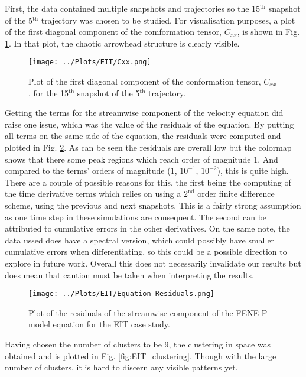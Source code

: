 \documentclass[12pt]{report} %
\begin{document}
First, the data contained multiple snapshots and trajectories so the 15$^{\text{th}}$ snapshot of the 5$^{\text{th}}$ trajectory was chosen to be studied. For visualisation purposes, a plot of the first diagonal component of the comformation tensor, $C_{xx}$, is shown in Fig. \ref{fig:EIT_Cxx}. In that plot, the chaotic arrowhead structure is clearly visible.

\begin{figure}[htbp]
  \centering
  \texttt{[image: ../Plots/EIT/Cxx.png]}
  \caption{Plot of the first diagonal component of the conformation tensor, $C_{xx}$, for the 15$^{\text{th}}$ snapshot of the 5$^{\text{th}}$ trajectory.}
  \label{fig:EIT_Cxx}
\end{figure}

Getting the terms for the streamwise component of the velocity equation did raise one issue, which was the value of the residuals of the equation. By putting all terms on the same side of the equation, the residuals were computed and plotted in Fig. \ref{fig:EIT_residuals}. As can be seen the residuals are overall low but the colormap shows that there some peak regions which reach order of magnitude 1. And compared to the terms' orders of magnitude ($1$, $10^{-1}$, $10^{-2}$), this is quite high. There are a couple of possible reasons for this, the first being the computing of the time derivative terms which relies on using a $2^{\text{nd}}$ order finite difference scheme, using the previous and next snapshots. This is a fairly strong assumption as one time step in these simulations are consequent. The second can be attributed to cumulative errors in the other derivatives. On the same note, the data ussed does have a spectral version, which could possibly have smaller cumulative errors when differentiating, so this could be a possible direction to explore in future work. Overall this does not necessarily invalidate our results but does mean that caution must be taken when interpreting the results.


\begin{figure}[htbp]
  \centering
  \texttt{[image: ../Plots/EIT/Equation Residuals.png]}
  \caption{Plot of the residuals of the streamwise component of the FENE-P model equation for the EIT case study.}
  \label{fig:EIT_residuals}
\end{figure}


Having chosen the number of clusters to be 9, the clustering in space was obtained and is plotted in Fig. \ref{fig:EIT_clustering}. Though with the large number of clusters, it is hard to discern any visible patterns yet.
\end{document}
